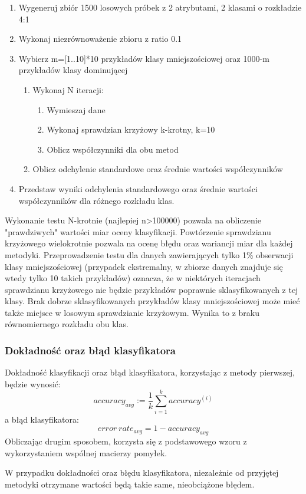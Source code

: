 \begin{enumerate}
	\item Wygeneruj zbiór 1500 losowych próbek z 2 atrybutami, 2 klasami o rozkładzie 4:1
	\item Wykonaj niezrównoważenie zbioru z ratio 0.1
	\item Wybierz m=[1..10]*10 przykładów klasy mniejszościowej oraz 1000-m przykładów klasy dominującej
	\begin{enumerate}
		\item  Wykonaj N iteracji:
		\begin{enumerate}
			\item Wymieszaj dane
			\item Wykonaj sprawdzian krzyżowy k-krotny, k=10
			\item Oblicz współczynniki dla obu metod
		\end{enumerate}
		\item Oblicz odchylenie standardowe oraz średnie wartości współczynników
	\end{enumerate}
	\item Przedstaw wyniki odchylenia standardowego oraz średnie wartości współczynników dla różnego rozkładu klas.
\end{enumerate}
Wykonanie testu N-krotnie (najlepiej n>100000) pozwala na obliczenie "prawdziwych" wartości miar oceny klasyfikacji. Powtórzenie sprawdzianu krzyżowego wielokrotnie pozwala na ocenę błędu oraz wariancji miar dla każdej metodyki. Przeprowadzenie testu dla danych zawierających tylko 1\% obserwacji klasy mniejszościowej (przypadek ekstremalny, w zbiorze danych znajduje się wtedy tylko 10 takich przykładów) oznacza, że w niektórych iteracjach sprawdzianu krzyżowego nie będzie przykładów poprawnie sklasyfikowanych z tej klasy. Brak dobrze sklasyfikowanych przykładów klasy mniejszościowej może mieć także miejsce w losowym sprawdzianie krzyżowym. Wynika to z braku równomiernego rozkładu obu klas. 
\subsubsection{Dokładność oraz błąd klasyfikatora}
Dokładność klasyfikacji oraz błąd klasyfikatora, korzystając z metody pierwszej, będzie wynosić:
\[accuracy_{avg} := \frac{1}{k} \sum_{i=1}^{k} accuracy^{(i)}\]
a błąd klasyfikatora:
\[error\ rate_{avg} = 1 - accuracy_{avg}\]
Obliczając drugim sposobem, korzysta się z podstawowego wzoru z wykorzystaniem wspólnej macierzy pomyłek. \par
W przypadku dokładności oraz błędu klasyfikatora, niezależnie od przyjętej metodyki otrzymane wartości będą takie same, nieobciążone błędem.
